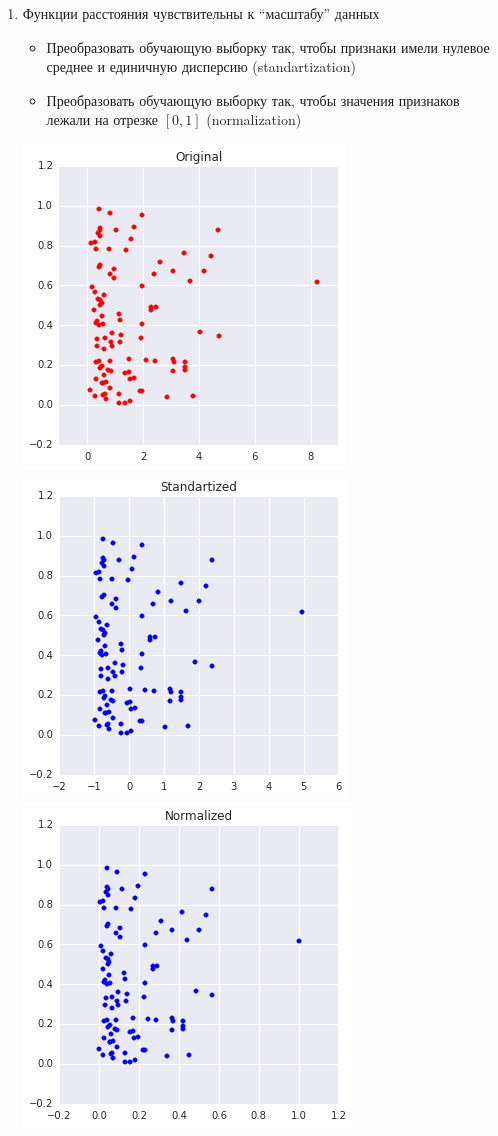 \documentclass[aspectratio=169]{beamer}
\begin{document}
\begin{frame}

\begin{enumerate}
\item Функции расстояния чувствительны к ``масштабу'' данных
\begin{itemize}
\item Преобразовать обучающую выборку так, чтобы  признаки имели нулевое среднее и единичную дисперсию (standartization)
\item Преобразовать обучающую выборку так, чтобы значения признаков лежали на отрезке $[0, 1]$ (normalization)
\end{itemize}
\begin{center}
\includegraphics[scale=0.2]{images/orig.png}
\includegraphics[scale=0.2]{images/std.png}
\includegraphics[scale=0.2]{images/norm.png}

\end{center}
\end{enumerate}
\end{frame}
\end{document}
